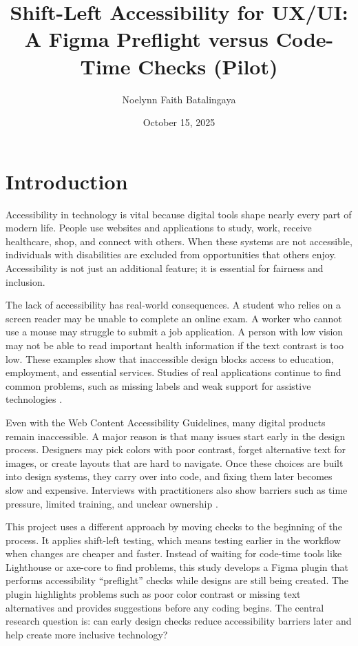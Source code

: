 \documentclass[12pt]{article}
\title{Shift-Left Accessibility for UX/UI: A Figma Preflight versus Code-Time Checks (Pilot)}
\author{Noelynn Faith Batalingaya}
\date{October 15, 2025}
\begin{document}
\maketitle
\doublespacing

\section{Introduction}
Accessibility in technology is vital because digital tools shape nearly every part of modern life. People use websites and applications to study, work, receive healthcare, shop, and connect with others. When these systems are not accessible, individuals with disabilities are excluded from opportunities that others enjoy. Accessibility is not just an additional feature; it is essential for fairness and inclusion.

The lack of accessibility has real-world consequences. A student who relies on a screen reader may be unable to complete an online exam. A worker who cannot use a mouse may struggle to submit a job application. A person with low vision may not be able to read important health information if the text contrast is too low. These examples show that inaccessible design blocks access to education, employment, and essential services. Studies of real applications continue to find common problems, such as missing labels and weak support for assistive technologies \cite{alshayban2020androidaccess}.

Even with the Web Content Accessibility Guidelines, many digital products remain inaccessible. A major reason is that many issues start early in the design process. Designers may pick colors with poor contrast, forget alternative text for images, or create layouts that are hard to navigate. Once these choices are built into design systems, they carry over into code, and fixing them later becomes slow and expensive. Interviews with practitioners also show barriers such as time pressure, limited training, and unclear ownership \cite{shi2023uxaccesspractice}.

This project uses a different approach by moving checks to the beginning of the process. It applies shift-left testing, which means testing earlier in the workflow when changes are cheaper and faster. Instead of waiting for code-time tools like Lighthouse or axe-core to find problems, this study develops a Figma plugin that performs accessibility “preflight” checks while designs are still being created. The plugin highlights problems such as poor color contrast or missing text alternatives and provides suggestions before any coding begins. The central research question is: can early design checks reduce accessibility barriers later and help create more inclusive technology?
\end{document}
